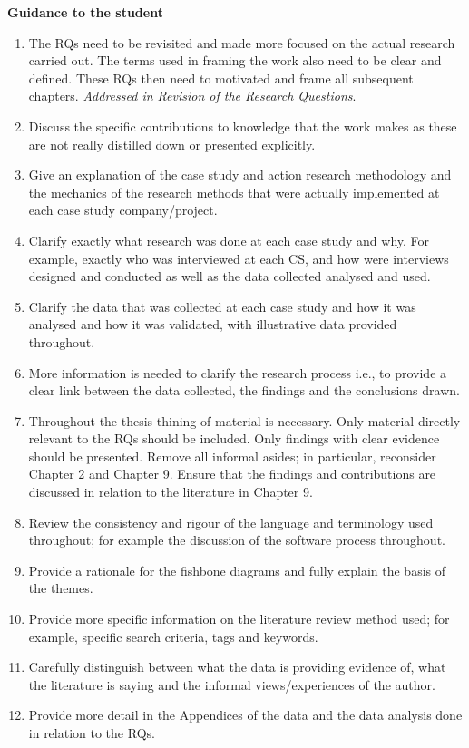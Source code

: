 \textbf{Guidance to the student}
\begin{enumerate}
    \item The RQs need to be revisited and made more focused on the actual research carried out. The terms used in framing the work also need to be clear and defined. These RQs then need to motivated and frame all subsequent chapters. \emph{Addressed in \href{corrections-rqs}{Revision of the Research Questions}}.
    \item Discuss the specific contributions to knowledge that the work makes as these are not really distilled down or presented explicitly.
    \item Give an explanation of the case study and action research methodology and the mechanics of the research methods that were actually implemented at each case study company/project.
    \item Clarify exactly what research was done at each case study and why. For example, exactly who was interviewed at each CS, and how were interviews designed and conducted as well as the data collected analysed and used.
    \item Clarify the data that was collected at each case study and how it was analysed and how it was validated, with illustrative data provided throughout.
    \item More information is needed to clarify the research process i.e., to provide a clear link between the data collected, the findings and the conclusions drawn.
    \item Throughout the thesis thining of material is necessary. Only material directly relevant to the RQs should be included. Only findings with clear evidence should be presented. Remove all informal asides; in particular, reconsider Chapter 2 and Chapter 9. Ensure that the findings and contributions are discussed in relation to the literature in Chapter 9.
    \item Review the consistency and rigour of the language and terminology used throughout; for example the discussion of the software process throughout.
    \item Provide a rationale for the fishbone diagrams and fully explain the basis of the themes.
    \item Provide more specific information on the literature review method used; for example, specific search criteria, tags and keywords.
    \item Carefully distinguish between what the data is providing evidence of, what the literature is saying and the informal views/experiences of the author.
    \item Provide more detail in the Appendices of the data and the data analysis done in relation to the RQs.
\end{enumerate}

